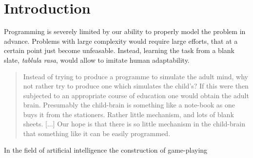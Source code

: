 \chapter{Introduction}

Programming is severely limited by our ability to properly model the problem in advance. Problems with large complexity would require large efforts, that at a certain point just become unfeasable. Instead, learning the task from a blank slate, \emph{tablula rasa}, would allow to imitate human adaptability.

\begin{quote}
    Instead of trying to produce a programme to simulate the adult mind, why not rather try to produce one which simulates the child’s? If this were then subjected to an appropriate course of education one would obtain the adult brain. Presumably the child-brain is something like a note-book as one buys it from the stationers. Rather little mechanism, and lots of blank sheets. [...] Our hope is that there is so little mechanism in the child-brain that something like it can be easily programmed.
    \cite{turing_icomputing_1950}
\end{quote}

In the field of artificial intelligence the construction of game-playing